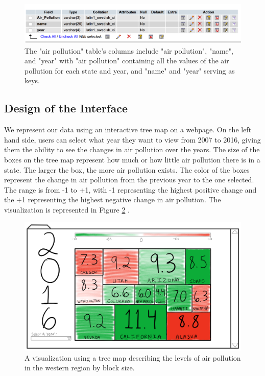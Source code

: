 \documentclass[journal]{vgtc}                %
\begin{document}
\begin{figure}
\centering
\includegraphics[width=\columnwidth]{air_poll_db}
\caption{The "air pollution" table's columns include "air pollution", "name", and "year" with "air pollution" 
containing all the values of the air pollution for each state and year, and "name" and "year" serving as keys.}
\label{fig:airPoll}
\end{figure}

\subsection{Design of the Interface}

We represent our data using an interactive tree map on a webpage. On the left hand side, users can select what year 
they want to view from 2007 to 2016, giving them the ability to see the changes in air pollution over the years. The 
size of the boxes on the tree map represent how much or how little air pollution there is in a state. The larger the 
box, the more air pollution exists. The color of the boxes represent the change in air pollution from the previous 
year to the one selected. The range is from -1 to +1, with -1 representing the highest positive change and the +1 
representing the highest negative change in air pollution. The visualization is represented in Figure \ref{fig:Design}
.

\begin{figure}
\centering
\includegraphics[width=\columnwidth]{HW1Design}
\caption{A visualization using a tree map describing the levels of air pollution in the western region by block size.}
\label{fig:Design}
\end{figure}
\end{document}

